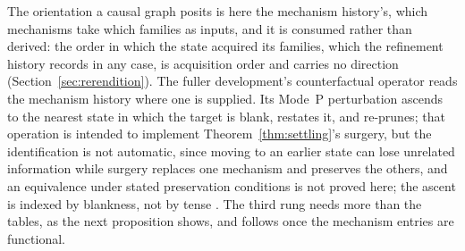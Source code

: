 \documentclass[11pt]{article}
\begin{document}
\noindent The orientation a causal graph posits is here the mechanism history's, which mechanisms take which families as inputs, and it is consumed rather than derived: the order in which the state acquired its families, which the refinement history records in any case, is acquisition order and carries no direction (Section~\ref{sec:rerendition}). The fuller development's counterfactual operator reads the mechanism history where one is supplied. Its Mode~P perturbation ascends to the nearest state in which the target is blank, restates it, and re-prunes; that operation is intended to implement Theorem~\ref{thm:settling}'s surgery, but the identification is not automatic, since moving to an earlier state can lose unrelated information while surgery replaces one mechanism and preserves the others, and an equivalence under stated preservation conditions is not proved here; the ascent is indexed by blankness, not by tense \cite{Aethus}. The third rung needs more than the tables, as the next proposition shows, and follows once the mechanism entries are functional.
\end{document}
